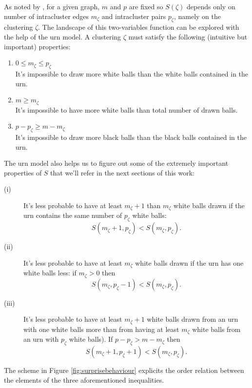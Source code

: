 As noted by \cite{Fleck2014}, for a given graph, $m$ and $p$ are fixed so $S(\zeta)$ depends only on number of intracluster edges $m_\zeta$ and intracluster pairs $p_\zeta$, namely on the clustering $\zeta$. The landscape of this two-variables function can be explored with the help of the urn model. A clustering $\zeta$ must satisfy the following (intuitive but important) properties:
\begin{enumerate}\label{list:urn_model_properties}
\item $0 \leq m_\zeta \leq p_\zeta$\\It's impossible to draw more white balls than the white balls contained in the urn.
\item $m\geq m_\zeta$\\It's impossible to have more white balls than total number of drawn balls.
\item $p-p_\zeta \geq m-m_\zeta$\\It's impossible to draw more black balls than the black balls contained in the urn.
\end{enumerate}
The urn model also helps us to figure out some of the extremely important properties of $S$ that we'll refer in the next sections of this work:
\begin{description}
\item[(i)]\label{list:surprise_properties} It's less probable to have at least $m_\zeta+1$ than $m_\zeta$ white balls drawn if the urn contains the same number of $p_\zeta$ white balls:
$$S(m_\zeta+1,p_\zeta) < S(m_\zeta,p_\zeta).$$
\item[(ii)] It's less probable to have at least $m_\zeta$ white balls drawn if the urn has one white balls less: if $m_\zeta >0$ then $$S(m_\zeta,p_\zeta-1) < S(m_\zeta,p_\zeta).$$
\item[(iii)] It's less probable to have at least $m_\zeta+1$ white balls drawn from an urn with one white balls more than from having at least $m_\zeta$ white balls from an urn with $p_\zeta$ white balls). If $p-p_\zeta> m-m_\zeta$ then $$S(m_\zeta+1,p_\zeta+1) < S(m_\zeta,p_\zeta).$$
\end{description}
The scheme in Figure \ref{fig:surprisebehaviour} explicits the order relation between the elements of the three aforementioned inequalities.

